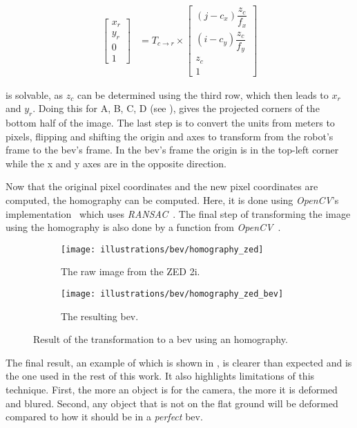 \begin{align}
    \label{eq:homography:complete}
    \begin{bmatrix}
        x_r \\
        y_r \\
        0   \\
        1
    \end{bmatrix} &= T_{c\rightarrow r} \times
    \begin{bmatrix}
    (j - c_x)
        \dfrac{z_c}{f_x}\\
        (i - c_y) \dfrac{z_c}{f_y} \\
        z_c                        \\
        1
    \end{bmatrix}
\end{align}

 is solvable, as $z_c$ can be determined using the third row, which then leads to $x_r$ and $y_r$.
Doing this for A, B, C, D (see ), gives the projected corners of the bottom half of the image.
The last step is to convert the units from meters to pixels, flipping and shifting the origin and axes to transform from the robot's frame
to the \gls{bev}'s frame.
In the \gls{bev}'s frame the origin is in the top-left corner while the x and y axes are in the opposite direction.


Now that the original pixel coordinates and the new pixel coordinates are computed, the homography can be computed.
Here, it is done using \textit{OpenCV}'s implementation~\cite{bradski_opencv_nodate} which uses \textit{RANSAC}~\cite{fischler_random_1981}.
The final step of transforming the image using the homography is also done by a function from \textit{OpenCV}~\cite{bradski_opencv_nodate}.


\begin{figure}[ht!]
    \begin{subfigure}[t]{0.35\textwidth}
        \texttt{[image: illustrations/bev/homography\_zed]}
        \caption{The raw image from the ZED 2i.}
        \label{fig:homography:zed}
    \end{subfigure}
    \hfill
    \begin{subfigure}[t]{0.58\textwidth}
        \texttt{[image: illustrations/bev/homography\_zed\_bev]}
        \caption{The resulting \gls{bev}.}
        \label{fig:homography:zed_bev}
    \end{subfigure}
    \hfill
    \caption{Result of the transformation to a \gls{bev} using an homography.}
    \label{fig:homography:example}
\end{figure}

The final result, an example of which is shown in , is clearer than expected and is the one used in the rest of this work.
It also highlights limitations of this technique.
First, the more an object is for the camera, the more it is deformed and blured.
Second, any object that is not on the flat ground will be deformed compared to how it should be in a \textit{perfect} \gls{bev}.